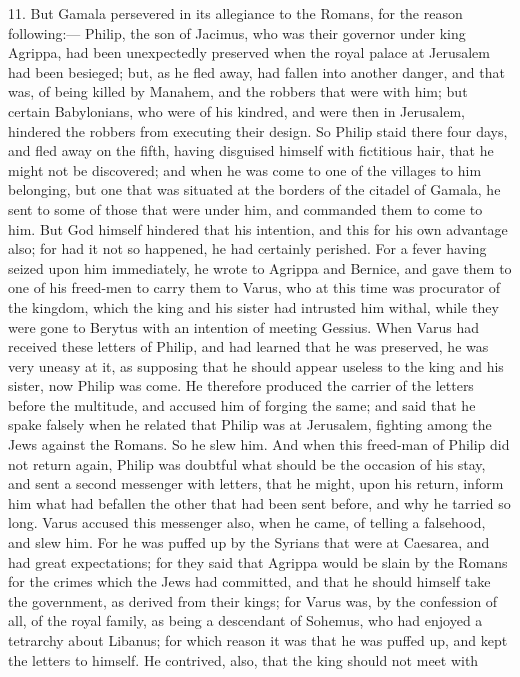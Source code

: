 11. But Gamala persevered in its allegiance to the Romans, for the reason
following:— Philip, the son of Jacimus, who was their governor under
king Agrippa, had been unexpectedly preserved when the royal palace at
Jerusalem had been besieged; but, as he fled away, had fallen into another
danger, and that was, of being killed by Manahem, and the robbers that
were with him; but certain Babylonians, who were of his kindred, and were
then in Jerusalem, hindered the robbers from executing their design. So
Philip staid there four days, and fled away on the fifth, having disguised
himself with fictitious hair, that he might not be discovered; and when he
was come to one of the villages to him belonging, but one that was
situated at the borders of the citadel of Gamala, he sent to some of those
that were under him, and commanded them to come to him. But God himself
hindered that his intention, and this for his own advantage also; for had
it not so happened, he had certainly perished. For a fever having seized
upon him immediately, he wrote to Agrippa and Bernice, and gave them to
one of his freed-men to carry them to Varus, who at this time was
procurator of the kingdom, which the king and his sister had intrusted him
withal, while they were gone to Berytus with an intention of meeting
Gessius. When Varus had received these letters of Philip, and had learned
that he was preserved, he was very uneasy at it, as supposing that he
should appear useless to the king and his sister, now Philip was come. He
therefore produced the carrier of the letters before the multitude, and
accused him of forging the same; and said that he spake falsely when he
related that Philip was at Jerusalem, fighting among the Jews against the
Romans. So he slew him. And when this freed-man of Philip did not return
again, Philip was doubtful what should be the occasion of his stay, and
sent a second messenger with letters, that he might, upon his return,
inform him what had befallen the other that had been sent before, and why
he tarried so long. Varus accused this messenger also, when he came, of
telling a falsehood, and slew him. For he was puffed up by the Syrians
that were at Caesarea, and had great expectations; for they said that
Agrippa would be slain by the Romans for the crimes which the Jews had
committed, and that he should himself take the government, as derived from
their kings; for Varus was, by the confession of all, of the royal family,
as being a descendant of Sohemus, who had enjoyed a tetrarchy about
Libanus; for which reason it was that he was puffed up, and kept the
letters to himself. He contrived, also, that the king should not meet with

